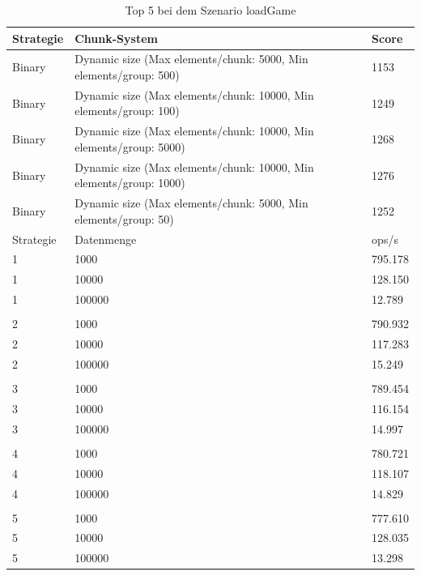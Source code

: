 \begin{table}[htp]
    \centering
    \caption{Top 5 bei dem Szenario loadGame}
    \begin{tabular}{|l|l|l|}
    \hline
        Strategie & Chunk-System & Score \\
        \hline
        Binary & Dynamic size (Max elements/chunk: 5000, Min elements/group: 500) & 1153\\
        Binary & Dynamic size (Max elements/chunk: 10000, Min elements/group: 100) & 1249\\
        Binary & Dynamic size (Max elements/chunk: 10000, Min elements/group: 5000) & 1268\\
        Binary & Dynamic size (Max elements/chunk: 10000, Min elements/group: 1000) & 1276\\
        Binary & Dynamic size (Max elements/chunk: 5000, Min elements/group: 50) & 1252\\
        \hline
        Strategie & Datenmenge & ops/s \\
        \hline
        1 & 1000 & 795.178\\
        1 & 10000 & 128.150\\
        1 & 100000 & 12.789\\
        & & \\
        2 & 1000 & 790.932\\
        2 & 10000 & 117.283\\
        2 & 100000 & 15.249\\
        & & \\
        3 & 1000 & 789.454\\
        3 & 10000 & 116.154\\
        3 & 100000 & 14.997\\
        & & \\
        4 & 1000 & 780.721\\
        4 & 10000 & 118.107\\
        4 & 100000 & 14.829\\
        & & \\
        5 & 1000 & 777.610\\
        5 & 10000 & 128.035\\
        5 & 100000 & 13.298\\
        \hline
    \end{tabular}
    \label{tbl:loadGame}
\end{table}

